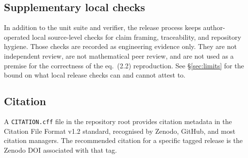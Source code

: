 \subsection{Supplementary local checks}

In addition to the unit suite and verifier, the release process keeps
author-operated local source-level checks for claim framing,
traceability, and repository hygiene. Those checks are recorded as
engineering evidence only. They are not independent review, are not
mathematical peer review, and are not used as a premise for the
correctness of the eq.~(2.2) reproduction. See \S\ref{sec:limits} for
the bound on what local release checks can and cannot attest to.

\subsection{Citation}

A \texttt{CITATION.cff} file in the repository root provides citation
metadata in the Citation File Format v1.2 standard, recognised by
Zenodo, GitHub, and most citation managers. The recommended citation
for a specific tagged release is the Zenodo DOI associated with that
tag.
